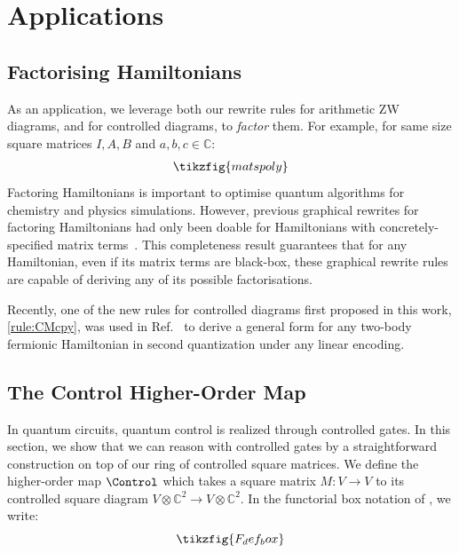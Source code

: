 \section{Applications}

\subsection{Factorising Hamiltonians}
As an application, we leverage both our rewrite rules for arithmetic ZW diagrams, and for controlled diagrams, to \emph{factor} them.  For example, for same size square matrices $I, A, B$ and $a, b, c \in \mathbb{C}$:
\begin{gather}
    \tikzfig{matspoly}
\end{gather}
Factoring Hamiltonians is important to optimise quantum algorithms for chemistry and physics simulations. However, previous graphical rewrites for factoring Hamiltonians had only been doable for Hamiltonians with concretely-specified matrix terms~\cite{shaikh2022sum}. This completeness result guarantees that for any Hamiltonian, even if its matrix terms are black-box, these graphical rewrite rules are capable of deriving any of its possible factorisations.

Recently, one of the new rules for controlled diagrams first proposed in this work, \eqref{rule:CMcpy}, was used in Ref.~\cite{mcdowallrose2025f2q} to derive a general form for any two-body fermionic Hamiltonian in second quantization under any linear encoding.

\subsection{The Control Higher-Order Map}\label{sec:ctrlmap}
In quantum circuits, quantum control is realized through controlled gates.
In this section, we show that we can reason with controlled gates by a straightforward construction on top of our ring of controlled square matrices.
We define the higher-order map $\Control$ which takes a square matrix $M: V \to V$ to its controlled square diagram $V \otimes \mathbb{C}^2 \to V \otimes \mathbb{C}^2$. In the functorial box notation of \cite{mellies2006functorial}, we write:
\begin{equation}
    \tikzfig{F_def_box}
\end{equation}

